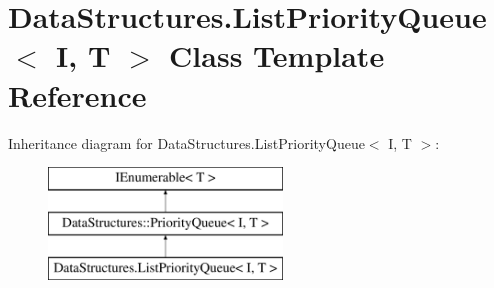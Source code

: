 \hypertarget{class_data_structures_1_1_list_priority_queue}{}\section{Data\+Structures.\+List\+Priority\+Queue$<$ I, T $>$ Class Template Reference}
\label{class_data_structures_1_1_list_priority_queue}
Inheritance diagram for Data\+Structures.\+List\+Priority\+Queue$<$ I, T $>$\+:\begin{figure}[H]
\begin{center}
\leavevmode
\includegraphics[height=3.000000cm]{class_data_structures_1_1_list_priority_queue}
\end{center}
\end{figure}
